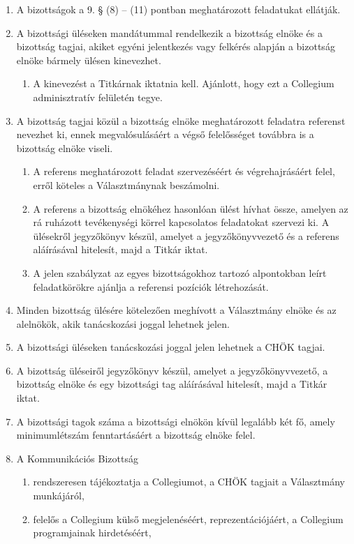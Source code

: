 \documentclass{../styles/rulebook}
\begin{document}
\begin{enumerate}
	\item A bizottságok a 9. § (8) -- (11) pontban meghatározott feladatukat ellátják.
	\item A bizottsági üléseken mandátummal rendelkezik a bizottság elnöke és a bizottság tagjai, akiket egyéni jelentkezés vagy felkérés alapján a bizottság elnöke bármely ülésen kinevezhet.
	\begin{enumerate}
		\item A kinevezést a Titkárnak iktatnia kell. Ajánlott, hogy ezt a Collegium adminisztratív felületén tegye.
	\end{enumerate}
	\item A bizottság tagjai közül a bizottság elnöke meghatározott feladatra referenst nevezhet ki, ennek megvalósulásáért a végső felelősséget továbbra is a bizottság elnöke viseli.
	\begin{enumerate}
		\item A referens meghatározott feladat szervezéséért és végrehajrásáért felel, erről köteles a Választmánynak beszámolni.
		\item A referens a bizottság elnökéhez hasonlóan ülést hívhat össze, amelyen az rá ruházott tevékenységi körrel kapcsolatos feladatokat szervezi ki. A ülésekről jegyzőkönyv készül, amelyet a jegyzőkönyvvezető és a referens aláírásával hitelesít, majd a Titkár iktat.
		\item A jelen szabályzat az egyes bizottságokhoz tartozó alpontokban leírt feladatkörökre ajánlja a referensi pozíciók létrehozását.
	\end{enumerate}
	\item Minden bizottság ülésére kötelezően meghívott a Választmány elnöke és az alelnökök, akik tanácskozási joggal lehetnek jelen.
	\item A bizottsági üléseken tanácskozási joggal jelen lehetnek a CHÖK tagjai.
	\item A bizottság üléseiről jegyzőkönyv készül, amelyet a jegyzőkönyvvezető, a bizottság elnöke és egy bizottsági tag aláírásával hitelesít, majd a Titkár iktat.
	\item A bizottsági tagok száma a bizottsági elnökön kívül legalább két fő, amely minimumlétszám fenntartásáért a bizottság elnöke felel.
	\item A Kommunikációs Bizottság
	\begin{enumerate}
		\item rendszeresen tájékoztatja a Collegiumot, a CHÖK tagjait a Választmány munkájáról,
		\item felelős a Collegium külső megjelenéséért, reprezentációjáért, a Collegium programjainak hirdetéséért,

\end{enumerate}
\end{enumerate}
\end{document}
